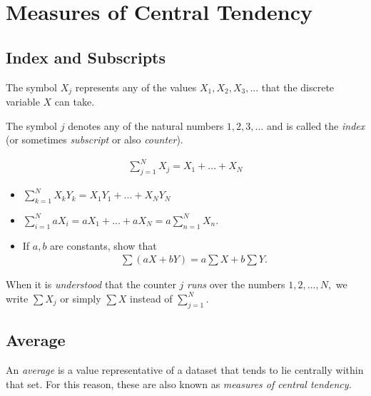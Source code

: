 \section{Measures of Central Tendency}

\subsection{Index and Subscripts}
The symbol $X_{j}$ represents any of the values $X_{1},X_{2},X_{3},...$ that the discrete variable $X$ can take.


The symbol $j$ denotes any of the natural numbers $1,2,3,...$ and is called the \emph{index} (or sometimes \emph{subscript} or also \emph{counter}).




\begin{definition}[Summation]
	\begin{align}
		\sum_{j=1}^{N}X_{j}=X_{1}+...+X_{N}
	\end{align}
\end{definition}



\begin{example}
	\begin{itemize}
		\item $\displaystyle \sum_{k=1}^{N}X_{k}Y_{k}=
		X_{1}Y_{1}+...+X_{N}Y_{N}$
		\item $\displaystyle \sum_{i=1}^{N} aX_{i}=
		aX_{1}+...+aX_{N}=a\sum_{n=1}^{N}X_{n}.$
		\item 
		If $a,b$ are constants, show that
		\begin{align}
			\sum \left( aX+bY \right)=a\sum X + b\sum Y.
		\end{align}
	\end{itemize}
	
\end{example}



\begin{remark}
	When it is \emph{understood} that the counter $j$ \emph{runs} over the numbers $1,2,...,N,$ we write $\sum X_{j}$ or simply $\sum X$ instead of $\sum_{j=1}^{N}.$
\end{remark}


\subsection{Average}
An \emph{average} is a value representative of a dataset that tends to lie centrally within that set. For this reason, these are also known as \emph{measures of central tendency.}



